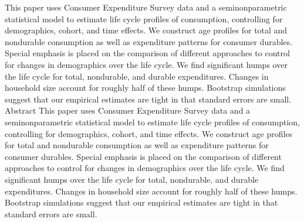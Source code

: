 This paper uses Consumer Expenditure Survey data and a seminonparametric statistical model to estimate life cycle profiles of consumption, controlling for demographics, cohort, and time effects. We construct age profiles for total and nondurable consumption as well as expenditure patterns for consumer durables. Special emphasis is placed on the comparison of different approaches to control for changes in demographics over the life cycle. We find significant humps over the life cycle for total, nondurable, and durable expenditures. Changes in household size account for roughly half of these humps. Bootstrap simulations suggest that our empirical estimates are tight in that standard errors are small. Abstract This paper uses Consumer Expenditure Survey data and a seminonparametric statistical model to estimate life cycle profiles of consumption, controlling for demographics, cohort, and time effects. We construct age profiles for total and nondurable consumption as well as expenditure patterns for consumer durables. Special emphasis is placed on the comparison of different approaches to control for changes in demographics over the life cycle. We find significant humps over the life cycle for total, nondurable, and durable expenditures. Changes in household size account for roughly half of these humps. Bootstrap simulations suggest that our empirical estimates are tight in that standard errors are small.
